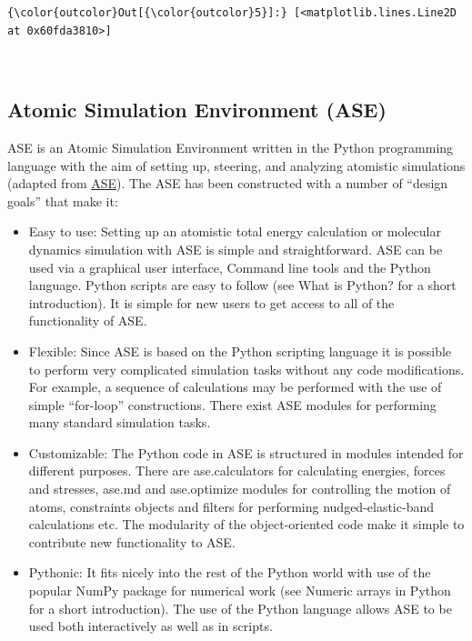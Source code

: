 \documentclass[11pt]{article}
\begin{document}
\begin{Verbatim}[commandchars=\\\{\}]
{\color{outcolor}Out[{\color{outcolor}5}]:} [<matplotlib.lines.Line2D at 0x60fda3810>]
\end{Verbatim}
            
    \begin{center}
    \end{center}
    { \hspace*{\fill} \\}
    
    \subsection{Atomic Simulation Environment
(ASE)}\label{atomic-simulation-environment-ase}

ASE is an Atomic Simulation Environment written in the Python
programming language with the aim of setting up, steering, and analyzing
atomistic simulations (adapted from
\href{https://wiki.fysik.dtu.dk/ase/about.html}{ASE}). The ASE has been
constructed with a number of ``design goals'' that make it:

\begin{itemize}
\item
  Easy to use: Setting up an atomistic total energy calculation or
  molecular dynamics simulation with ASE is simple and straightforward.
  ASE can be used via a graphical user interface, Command line tools and
  the Python language. Python scripts are easy to follow (see What is
  Python? for a short introduction). It is simple for new users to get
  access to all of the functionality of ASE.
\item
  Flexible: Since ASE is based on the Python scripting language it is
  possible to perform very complicated simulation tasks without any code
  modifications. For example, a sequence of calculations may be
  performed with the use of simple ``for-loop'' constructions. There
  exist ASE modules for performing many standard simulation tasks.
\item
  Customizable: The Python code in ASE is structured in modules intended
  for different purposes. There are ase.calculators for calculating
  energies, forces and stresses, ase.md and ase.optimize modules for
  controlling the motion of atoms, constraints objects and filters for
  performing nudged-elastic-band calculations etc. The modularity of the
  object-oriented code make it simple to contribute new functionality to
  ASE.
\item
  Pythonic: It fits nicely into the rest of the Python world with use of
  the popular NumPy package for numerical work (see Numeric arrays in
  Python for a short introduction). The use of the Python language
  allows ASE to be used both interactively as well as in scripts.
\end{itemize}
\end{document}
